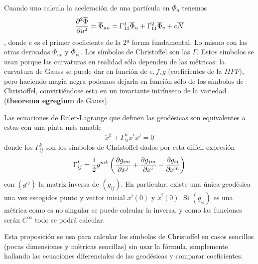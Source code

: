 \documentclass[palatino, bibnumbers]{apuntes}
\begin{document}
\indent Cuando uno calcula la aceleración de una partícula en $\overline{\Phi}_u$ tenemos $$\pdv[2]{\overline{\Phi}}{u}=\overline{\Phi}_{uu}=\Gamma^1_{11}\overline{\Phi}_u+\Gamma^2_{11}\overline{\Phi}_v+e\overline{N}$$, donde e es el primer coeficiente de la 2ª forma fundamental. Lo mismo con las otras derivadas $\overline{\Phi}_{uv}$ y $\overline{\Phi}_{vv}$. Los símbolos de Christoffel son las $\Gamma$. Estos símbolos se usan porque las curvaturas en realidad sólo dependen de las métricas: la curvatura de Gauss se puede dar en función de $e,f,g$ (coeficientes de la $II FF$), pero haciendo magia negra podemos dejarla en función sólo de los símbolos de Christoffel, convirtiéndose esta en un invariante intrínseco de la variedad (\textbf{theorema egregium} de Gauss).
\begin{prop}
Las ecuaciones de Euler-Lagrange que definen las geodésicas son equivalentes a estas con una pinta más amable
\begin{equation}
\label{eq:Geodesicas-Christoffel}
\ddot{x}^k+\Gamma^k_{ij}\dot{x}^i\dot{x}^j=0
\end{equation}
donde los $\Gamma^k_{ij}$ son los simbolos de Christoffel dados por esta difícil expresión
\begin{equation}
\label{eq:Christoffel-metrica}
\Gamma^k_{ij}=\frac{1}{2}g^{mk}\left(\pdv{g_{im}}{x^j}+\pdv{g_{jm}}{x^i}-\pdv{g_{ij}}{x^m}\right)
\end{equation}
con $(g^{ij})$ la matriz inversa de $(g_{ij})$. En particular, existe una única geodésica una vez escogidos punto y vector inicial $x^i(0)$ y $\dot{x}^i(0)$. Si $(g_{ij})$ es una métrica como es no singular se puede calcular la inversa, y como las funciones serán $C^\infty$ todo se podrá calcular.
\end{prop}

\begin{obs} Esta proposición se usa para calcular los símbolos de Christoffel en casos sencillos (pocas dimensiones y métricas sencillas) sin usar la fórmula, simplemente hallando las ecuaciones diferenciales de las geodésicas y comparar coeficientes.
\end{obs}
\end{document}
